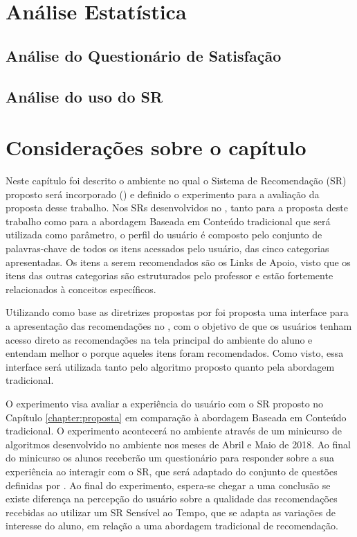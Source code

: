 \section{Análise Estatística}\label{section:analise-experimento}

\subsection{Análise do Questionário de Satisfação}

\subsection{Análise do uso do SR}

\section{Considerações sobre o capítulo}

Neste capítulo foi descrito o ambiente no qual o Sistema de Recomendação (SR) proposto será incorporado (\adaptweb) e definido o
experimento para a avaliação da proposta desse trabalho. Nos SRs desenvolvidos no \adaptweb, tanto para a proposta deste trabalho como para a abordagem
Baseada em Conteúdo tradicional que será utilizada como parâmetro, o perfil do usuário é composto pelo conjunto de palavras-chave de todos os itens acessados pelo usuário, das
cinco categorias apresentadas. Os itens a serem recomendados são os Links de Apoio, visto que os itens das outras categorias
são estruturados pelo professor e estão fortemente relacionados à conceitos específicos.

Utilizando como base as diretrizes propostas por  foi proposta uma interface para a apresentação das recomendações no \adaptweb,
com o objetivo de que os usuários tenham acesso direto as recomendações na tela principal do ambiente do aluno e entendam
melhor o porque aqueles itens foram recomendados. Como visto, essa interface será utilizada tanto pelo algoritmo proposto
quanto pela abordagem tradicional.

O experimento visa avaliar a experiência do usuário com o SR proposto no Capítulo \ref{chapter:proposta} em
comparação à abordagem Baseada em Conteúdo tradicional. O experimento acontecerá no ambiente
\adaptweb através de um minicurso de algoritmos desenvolvido no ambiente nos meses de
Abril e Maio de 2018. Ao final do minicurso os alunos receberão um questionário para responder sobre a sua experiência
ao interagir com o SR, que será adaptado do conjunto de questões definidas por . Ao final do
experimento, espera-se chegar a uma conclusão se existe diferença na percepção do usuário sobre a qualidade
das recomendações recebidas ao utilizar um SR Sensível ao Tempo, que se adapta as variações de interesse do
aluno, em relação a uma abordagem tradicional de recomendação.
